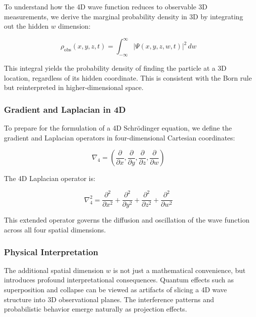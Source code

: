 \documentclass[12pt]{article}
\begin{document}
To understand how the 4D wave function reduces to observable 3D measurements, we derive the marginal probability density in 3D by integrating out the hidden $w$ dimension:

\begin{equation}
    \rho_{\text{obs}}(x, y, z, t) = \int_{-\infty}^{\infty} |\Psi(x, y, z, w, t)|^2 \, dw
\end{equation}

This integral yields the probability density of finding the particle at a 3D location, regardless of its hidden coordinate. This is consistent with the Born rule but reinterpreted in higher-dimensional space.


\subsubsection{Gradient and Laplacian in 4D}

To prepare for the formulation of a 4D Schr\"odinger equation, we define the gradient and Laplacian operators in four-dimensional Cartesian coordinates:

\begin{equation}
    \nabla_4 = \left( \frac{\partial}{\partial x}, \frac{\partial}{\partial y}, \frac{\partial}{\partial z}, \frac{\partial}{\partial w} \right)
\end{equation}

The 4D Laplacian operator is:

\begin{equation}
    \nabla_4^2 = \frac{\partial^2}{\partial x^2} + \frac{\partial^2}{\partial y^2} + \frac{\partial^2}{\partial z^2} + \frac{\partial^2}{\partial w^2}
\end{equation}

This extended operator governs the diffusion and oscillation of the wave function across all four spatial dimensions.

\subsubsection{Physical Interpretation}

The additional spatial dimension $w$ is not just a mathematical convenience, but introduces profound interpretational consequences. Quantum effects such as superposition and collapse can be viewed as artifacts of slicing a 4D wave structure into 3D observational planes. The interference patterns and probabilistic behavior emerge naturally as projection effects.
\end{document}
